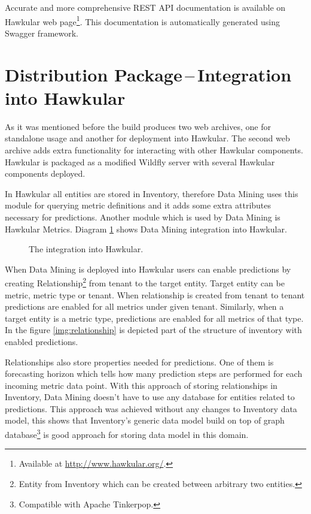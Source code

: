     Accurate and more comprehensive REST API documentation is available on Hawkular web page\footnote{Available at
    \url{http://www.hawkular.org/}.}. This documentation is automatically generated using Swagger framework.

    \section{Distribution Package\,--\,Integration into Hawkular} \label{sec:dist}
    As it was mentioned before the build produces two web archives, one for standalone usage and another for
    deployment into Hawkular. The second web archive adds extra functionality for interacting with other Hawkular
    components. Hawkular is packaged as a modified Wildfly server with several Hawkular components deployed.

    In Hawkular all entities are stored in Inventory, therefore Data Mining uses this module
    for querying metric definitions and it adds some extra attributes necessary for predictions. Another module
    which is used by Data Mining is Hawkular Metrics. Diagram \ref{img:hawkular-interaction} shows Data Mining
    integration into Hawkular.

    \begin{figure}[H]
        \begin{center}
            \caption{The integration into Hawkular.}
            \label{img:hawkular-interaction}
        \end{center}
    \end{figure}

    When Data Mining is deployed into Hawkular users can enable predictions by creating Relationship\footnote{Entity
    from Inventory which can be created between arbitrary two entities.} from tenant to the target entity. Target
    entity can be metric, metric type or tenant. When relationship is created from tenant to tenant predictions are
    enabled for all metrics under given tenant. Similarly, when a target entity is a metric type, predictions are
    enabled for all metrics of that type. In the figure \ref{img:relationship} is depicted part of the structure of
    inventory with enabled predictions.

    Relationships also store properties needed for predictions. One of them is forecasting horizon which tells how
    many prediction steps are performed for each incoming metric data point. With this approach of storing
    relationships in Inventory, Data Mining doesn't have to use any database for entities related to predictions.
    This approach was achieved without any changes to Inventory data model, this shows that Inventory's generic data
    model build on top of graph database\footnote{Compatible with Apache Tinkerpop.} is good approach for storing data
    model in this domain.

